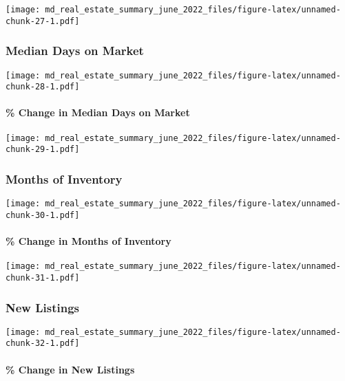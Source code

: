 \documentclass[
]{article}
\begin{document}
\texttt{[image: md\_real\_estate\_summary\_june\_2022\_files/figure-latex/unnamed-chunk-27-1.pdf]}

\hypertarget{median-days-on-market-1}{%
\subsubsection{Median Days on Market}\label{median-days-on-market-1}}

\texttt{[image: md\_real\_estate\_summary\_june\_2022\_files/figure-latex/unnamed-chunk-28-1.pdf]}

\hypertarget{change-in-median-days-on-market-1}{%
\paragraph{\% Change in Median Days on
Market}\label{change-in-median-days-on-market-1}}

\texttt{[image: md\_real\_estate\_summary\_june\_2022\_files/figure-latex/unnamed-chunk-29-1.pdf]}

\hypertarget{months-of-inventory-1}{%
\subsubsection{Months of Inventory}\label{months-of-inventory-1}}

\texttt{[image: md\_real\_estate\_summary\_june\_2022\_files/figure-latex/unnamed-chunk-30-1.pdf]}

\hypertarget{change-in-months-of-inventory-1}{%
\paragraph{\% Change in Months of
Inventory}\label{change-in-months-of-inventory-1}}

\texttt{[image: md\_real\_estate\_summary\_june\_2022\_files/figure-latex/unnamed-chunk-31-1.pdf]}

\hypertarget{new-listings-1}{%
\subsubsection{New Listings}\label{new-listings-1}}

\texttt{[image: md\_real\_estate\_summary\_june\_2022\_files/figure-latex/unnamed-chunk-32-1.pdf]}

\hypertarget{change-in-new-listings-1}{%
\paragraph{\% Change in New Listings}\label{change-in-new-listings-1}}
\end{document}
